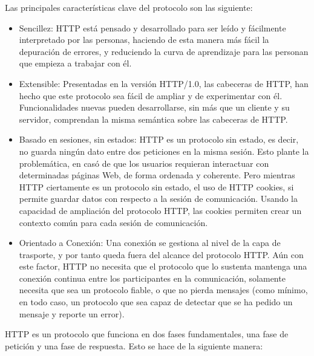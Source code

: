 Las principales características clave del protocolo son las siguiente:
\begin{itemize}
\item Sencillez: HTTP está pensado y desarrollado para ser leído y fácilmente interpretado por las personas, haciendo de esta manera más fácil la depuración de errores, y reduciendo la curva de aprendizaje para las personan que empieza a trabajar con él.
\item Extensible: Presentadas en la versión HTTP/1.0, las cabeceras de HTTP, han hecho que este protocolo sea fácil de ampliar y de experimentar con él. Funcionalidades nuevas pueden desarrollarse, sin más que un cliente y su servidor, comprendan la misma semántica sobre las cabeceras de HTTP.
\item Basado en sesiones, sin estados: HTTP es un protocolo sin estado, es decir, no guarda ningún dato entre dos peticiones en la misma sesión. Esto plante la problemática, en casó de que los usuarios requieran interactuar con determinadas páginas Web, de forma ordenada y coherente. Pero mientras HTTP ciertamente es un protocolo sin estado, el uso de HTTP cookies, si permite guardar datos con respecto a la sesión de comunicación. Usando la capacidad de ampliación del protocolo HTTP, las cookies permiten crear un contexto común para cada sesión de comunicación.
\item Orientado a Conexión: Una conexión se gestiona al nivel de la capa de trasporte, y por tanto queda fuera del alcance del protocolo HTTP. Aún con este factor, HTTP no necesita que el protocolo que lo sustenta mantenga una conexión continua entre los participantes en la comunicación, solamente necesita que sea un protocolo fiable, o que no pierda mensajes (como mínimo, en todo caso, un protocolo que sea capaz de detectar que se ha pedido un mensaje y reporte un error).
\end{itemize}

HTTP es un protocolo que funciona en dos fases fundamentales, una fase de petición y una fase de respuesta. Esto se hace de la siguiente manera:

